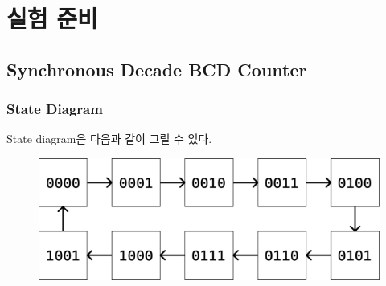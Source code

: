\documentclass{scrartcl}
\begin{document}
\section{실험 준비}
\subsection{Synchronous Decade BCD Counter}
\subsubsection{State Diagram}
State diagram은 다음과 같이 그릴 수 있다.
\begin{figure}[H]
  \centering
  \includegraphics[width=0.7\linewidth]{lab6_1_states.pdf}
\end{figure}
\end{document}
